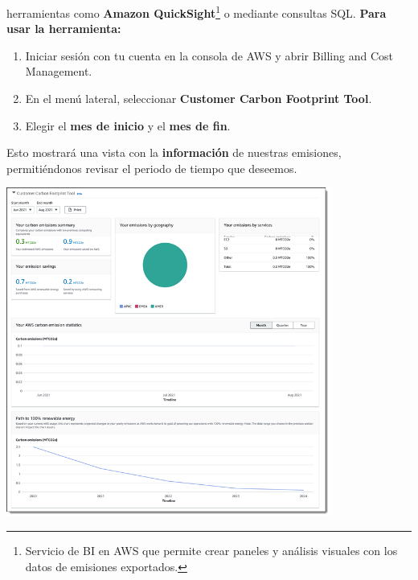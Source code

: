 \documentclass[12pt,a4paper]{report}
\begin{document}
herramientas como \textbf{Amazon QuickSight}\footnote{Servicio de BI en AWS que permite crear paneles y análisis visuales con los datos de emisiones exportados.} o mediante consultas SQL.
\textbf{Para usar la herramienta:}
\begin{enumerate}
  \item Iniciar sesión con tu cuenta en la consola de AWS y abrir Billing and Cost
        Management.
  \item En el menú lateral, seleccionar \textbf{Customer Carbon Footprint Tool}.
  \item Elegir el \textbf{mes de inicio} y el \textbf{mes de fin}.
\end{enumerate}
Esto mostrará una vista con la \textbf{información} de nuestras emisiones, permitiéndonos revisar el periodo de tiempo que deseemos.
\begin{center}
  \includegraphics[width=0.8\textwidth]{imagenes/AWS_1.png}
\end{center}
\end{document}
